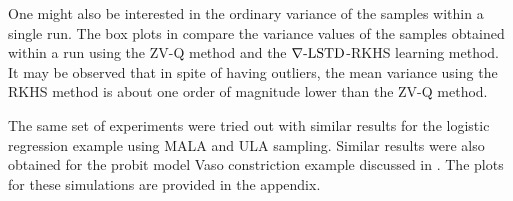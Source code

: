 One might also be interested in the ordinary variance of the samples within a single run. The box plots in  compare the variance values of the samples obtained within a run using the ZV-Q method and the $\nabla\text{-LSTD}$-RKHS learning method. It may be observed that in spite of having outliers, the mean variance using the RKHS method is about one order of magnitude lower than the ZV-Q method.

The same set of experiments were tried out with similar results for the logistic regression example using MALA and ULA sampling. Similar results were also obtained for the probit model Vaso constriction example discussed in \cite{papmirgir14}. The plots for these simulations are provided in the appendix. %

\begin{figure}[htbp]
	\centering
	\mbox{
	}
	\mbox{
}
\end{figure}
